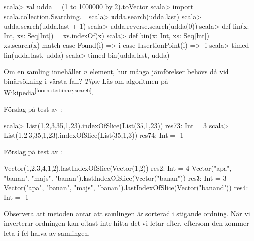 \begin{REPL}
scala> val udda = (1 to 1000000 by 2).toVector
scala> import scala.collection.Searching._
scala> udda.search(udda.last)
scala> udda.search(udda.last + 1)
scala> udda.reverse.search(udda(0))
scala> def lin(x: Int, xs: Seq[Int]) = xs.indexOf(x)
scala> def bin(x: Int, xs: Seq[Int]) = xs.search(x) match {
         case Found(i) => i
         case InsertionPoint(i) => -i
       }
scala> timed{ lin(udda.last, udda) }
scala> timed{ bin(udda.last, udda) }
\end{REPL}

\Subtask\Pen Om en samling innehåller $n$ element, hur många jämförelser behövs då vid binärsökning i värsta fall? \emph{Tips:} Läs om algoritmen på Wikipedia\textsuperscript{\ref{footnote:binarysearch}}.


\SOLUTION


\TaskSolved \what


\SubtaskSolved
Förslag på test av :
\begin{REPLnonum}
scala> List(1,2,3,35,1,23).indexOfSlice(List(35,1,23))
res73: Int = 3
scala> List(1,2,3,35,1,23).indexOfSlice(List(35,1,3))
res74: Int = -1
\end{REPLnonum}

\SubtaskSolved
Förslag på test av :
\begin{REPLnonum}
Vector(1,2,3,4,1,2).lastIndexOfSlice(Vector(1,2))
res2: Int = 4
Vector("apa", "banan", "majs", "banan").lastIndexOfSlice(Vector("banan"))
res3: Int = 3
Vector("apa", "banan", "majs", "banan").lastIndexOfSlice(Vector("banand"))
res4: Int = -1
\end{REPLnonum}

\SubtaskSolved
Observera att metoden  antar att samlingen är sorterad i stigande ordning. När vi inverterar ordningen kan  oftast inte hitta det vi letar efter, eftersom den kommer leta i fel halva av samlingen.

